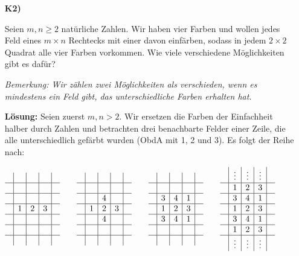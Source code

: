 \documentclass[language=german,style=solution]{smo}
\begin{document}
\begin{enumerate}
\newpage %

\item[\textbf{K2)}] 

Seien $m, n\geq 2$ natürliche Zahlen. Wir haben vier Farben und wollen jedes Feld eines $m\times n$ Rechtecks mit einer davon einfärben, sodass in jedem $2 \times 2$ Quadrat alle vier Farben vorkommen. Wie viele verschiedene Möglichkeiten gibt es dafür?

\textit{Bemerkung: Wir zählen zwei Möglichkeiten als verschieden, wenn es mindestens ein Feld gibt, das unterschiedliche Farben erhalten hat.}

\textbf{Lösung:}
Seien zuerst $m,n>2$. Wir ersetzen die Farben der Einfachheit halber durch Zahlen und betrachten drei benachbarte Felder einer Zeile, die alle unterschiedlich gefärbt wurden (ObdA mit 1, 2 und 3). Es folgt der Reihe nach:

$\begin{array}{c|c|c|c|c}
   &  &  &  & \\
  \hline
   &  &  &  & \\
  \hline
   &  &  &  & \\
  \hline
   &1 &2 &3 & \\
  \hline
   &  &  &  & \\
  \hline
   &  &  &  & \\
  \hline
   &  &  &  & \\
\end{array}
\qquad
\begin{array}{c|c|c|c|c}
   &  &  &  & \\
  \hline
   &  &  &  & \\
  \hline
   &  &4 &  & \\
  \hline
   &1 &2 &3 & \\
  \hline
   &  &4 &  & \\
  \hline
   &  &  &  & \\
  \hline
   &  &  &  & \\
\end{array}
\qquad
\begin{array}{c|c|c|c|c}
   &  &  &  & \\
  \hline
   &  &  &  & \\
  \hline
   &3 &4 &1 & \\
  \hline
   &1 &2 &3 & \\
  \hline
   &3 &4 &1 & \\
  \hline
   &  &  &  & \\
  \hline
   &  &  &  & \\
\end{array}
\qquad
\begin{array}{c|c|c|c|c}
 & \vdots & \vdots & \vdots & \\
  \hline
   & 1 & 2 & 3 & \\
  \hline
   & 3 & 4 & 1 & \\
  \hline
   & 1 & 2 & 3 & \\
  \hline
   & 3 & 4 & 1 & \\
  \hline
   & 1 & 2 & 3 & \\
  \hline
 & \vdots & \vdots & \vdots & \\ 
\end{array}$


\end{enumerate}
\end{document}
